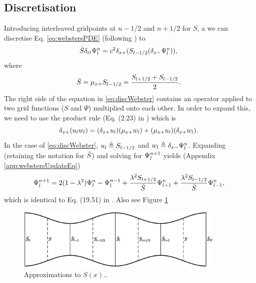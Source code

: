 \subsection{Discretisation}
Introducing interleaved gridpoints at $n-1/2$ and $n+1/2$ for $S$, a we can discretise Eq. \eqref{eq:webstersPDE} (following \cite{Bilbao2018}) to
\begin{equation}\label{eq:discWebster}
    \bar{S} \delta_{tt}\Psi^n_l = c^2\delta_{x+}(S_{l-1/2}(\delta_{x-}\Psi_l^n)),
\end{equation}
where
\begin{equation}
    \bar{S} = \mu_{x+}S_{l-1/2} = \frac{S_{l+1/2} + S_{l-1/2}}{2}.
\end{equation}
The right side of the equation in \eqref{eq:discWebster} contains an operator applied to two grid functions ($S$ and $\Psi$) multiplied onto each other. In order to expand this, we need to use the product rule (Eq. (2.23) in \cite{theBible}) which is
\begin{equation}
    \delta_{x+} (u_lw_l) = (\delta_{x+} u_l)(\mu_{x+}{w_l}) + (\mu_{x+} u_l)(\delta_{x+} w_l).
\end{equation}
In the case of \eqref{eq:discWebster}, $u_l \triangleq S_{l-1/2}$ and $w_l \triangleq \delta_{x-}\Psi_l^n$. Expanding (retaining the notation for $\bar{S}$) and solving for $\Psi_l^{n+1}$ yields (Appendix \ref{app:webstersUpdateEq})
\begin{equation}
    \Psi_l^{n+1} = 2(1-\lambda^2)\Psi_l^n-\Psi_l^{n-1}+ \frac{\lambda^2S_{l+1/2}}{\bar{S}}\Psi_{l+1}^n + \frac{\lambda^2S_{l-1/2}}{\bar{S}}\Psi_{l-1}^n,\label{eq:webstersUpdateEq}
\end{equation}
which is identical to Eq. (19.51) in \cite{Bilbao2018}.
Also see Figure \ref{fig:variableCrossSection}

\begin{figure}[h]
    \centering
    \includegraphics[width=0.9\textwidth]{figures/resonators/variableCrossSection.eps}
    \caption{Approximations to $S(x)$.. \label{fig:variableCrossSection}}
\end{figure}

